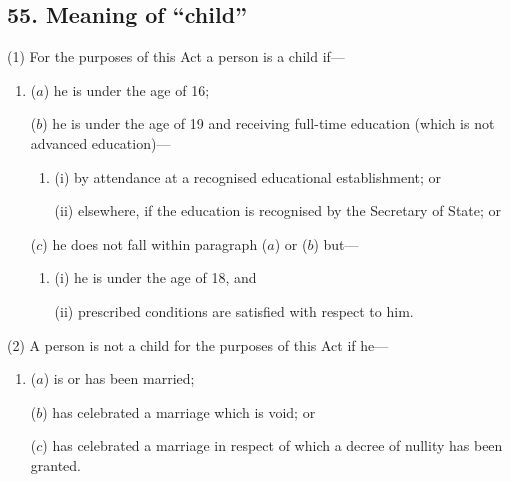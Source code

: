 \documentclass[12pt,a4paper]{article}
\begin{document}

\subsection{55. Meaning of “child”}

(1) For the purposes of this Act a person is a child if—
\begin{enumerate}\item[]
($a$) he is under the age of 16;

($b$) he is under the age of 19 and receiving full-time education (which is not advanced education)—
\begin{enumerate}\item[]
(i) by attendance at a recognised educational establishment; or

(ii) elsewhere, if the education is recognised by the Secretary of State; or
\end{enumerate}

($c$) he does not fall within paragraph ($a$)  or ($b$)  but—
\begin{enumerate}\item[]
(i) he is under the age of 18, and

(ii) prescribed conditions are satisfied with respect to him.
\end{enumerate}
\end{enumerate}

(2) A person is not a child for the purposes of this Act if he—
\begin{enumerate}\item[]
($a$) is or has been married;

($b$) has celebrated a marriage which is void; or

($c$) has celebrated a marriage in respect of which a decree of nullity has been granted.
\end{enumerate}
\end{document}
